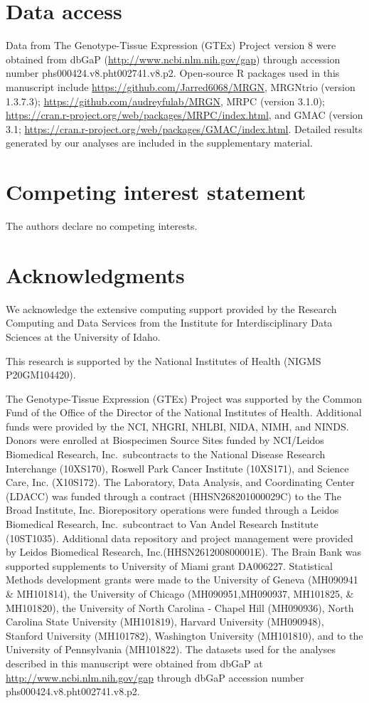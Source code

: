 \documentclass[12pt,letterpaper]{report}
\begin{document}
\section*{Data access}
Data from The Genotype-Tissue Expression (GTEx) Project version 8 were obtained from dbGaP (\url{http://www.ncbi.nlm.nih.gov/gap}) through 
accession number phs000424.v8.pht002741.v8.p2.  Open-source R packages used in this manuscript include \url{https://github.com/Jarred6068/MRGN}, MRGNtrio (version 1.3.7.3);  \url{https://github.com/audreyfulab/MRGN}, MRPC (version 3.1.0); \url{https://cran.r-project.org/web/packages/MRPC/index.html}, and GMAC (version 3.1; 
\url{https://cran.r-project.org/web/packages/GMAC/index.html}.  Detailed results generated by our analyses are included in the supplementary 
material.

\section*{Competing interest statement}
The authors declare no competing interests.


\section*{Acknowledgments}
We acknowledge the extensive computing support provided by the Research Computing and Data Services from the Institute for Interdisciplinary Data Sciences at the University of Idaho.

This research is supported by the National Institutes of Health (NIGMS P20GM104420).

The Genotype-Tissue Expression (GTEx) Project was supported by the Common Fund of the Office of the Director of the National Institutes of Health. Additional funds were provided by the NCI, NHGRI, NHLBI, NIDA, NIMH, and NINDS. Donors were enrolled at Biospecimen Source Sites funded by NCI/Leidos Biomedical Research, Inc.\ subcontracts to the National Disease Research Interchange (10XS170), Roswell Park Cancer Institute (10XS171), and Science Care, Inc. (X10S172). The Laboratory, Data Analysis, and Coordinating Center (LDACC) was funded through a contract (HHSN268201000029C) to the The Broad Institute, Inc. Biorepository operations were funded through a Leidos Biomedical Research, Inc.\ subcontract to Van Andel Research Institute (10ST1035). Additional data repository and project management were provided by Leidos Biomedical Research, Inc.(HHSN261200800001E). The Brain Bank was supported supplements to University of Miami grant DA006227. Statistical Methods development grants were made to the University of Geneva (MH090941 \& MH101814), the University of Chicago (MH090951,MH090937, MH101825, \& MH101820), the University of North Carolina - Chapel Hill (MH090936), North Carolina State University (MH101819), Harvard University (MH090948), Stanford University (MH101782), Washington University (MH101810), and to the University of Pennsylvania (MH101822). The datasets used for the analyses described in this manuscript were obtained from dbGaP at \url{http://www.ncbi.nlm.nih.gov/gap} through dbGaP accession number phs000424.v8.pht002741.v8.p2.
\end{document}
